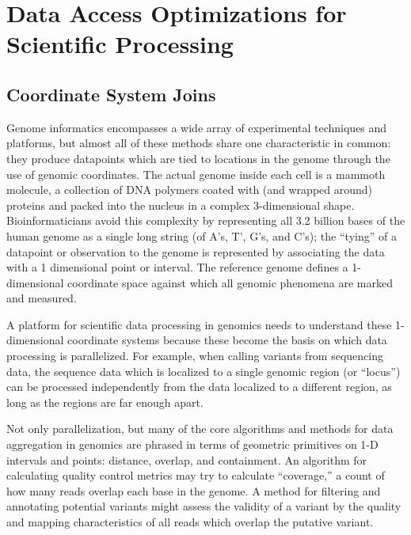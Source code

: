 \documentclass{acm_proc_article-sp}
\begin{document}
\section{Data Access Optimizations for \\ Scientific Processing}
\label{sec:optimizations-scientific-processing}

\subsection{Coordinate System Joins}
\label{sec:coordinate-system-joins}

Genome informatics encompasses a wide array of experimental techniques and platforms, but almost all
of these methods share one characteristic in common: they produce datapoints which are tied to
locations in the genome through the use of genomic coordinates. The actual genome inside each cell is a
mammoth molecule, a collection of DNA polymers coated with (and wrapped around) proteins and
packed into the nucleus in a complex 3-dimensional shape. Bioinformaticians avoid this complexity by
representing all 3.2 billion bases of the human genome as a single long string (of A's, T', G's, and C's);
the ``tying'' of a datapoint or observation to the genome is represented by associating the data with a 1
dimensional point or interval. The reference genome defines a 1-dimensional coordinate space against
which all genomic phenomena are marked and measured.

A platform for scientific data processing in genomics needs to understand these 1-dimensional coordinate
systems because these become the basis on which data processing is parallelized. For example, when
calling variants from sequencing data, the sequence data which is localized to a single genomic region
(or ``locus'') can be processed independently from the data localized to a different region, as long as the
regions are far enough apart.

Not only parallelization, but many of the core algorithms and methods for data aggregation in genomics
are phrased in terms of geometric primitives on 1-D intervals and points: distance, overlap, and
containment.  An algorithm for calculating quality control metrics may try to calculate ``coverage,'' a count
of how many reads overlap each base in the genome. A method for filtering and annotating potential
variants might assess the validity of a variant by the quality and mapping characteristics of all reads
which overlap the putative variant.
\end{document}
